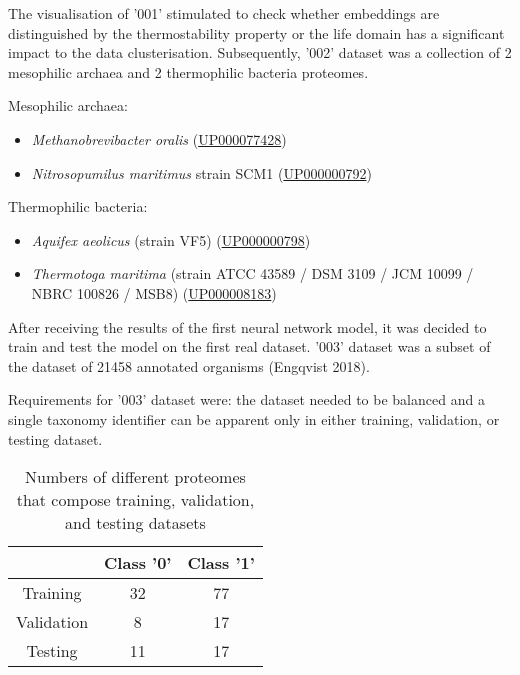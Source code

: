 \documentclass[12pt]{report}
\begin{document}
	The visualisation of '001' stimulated to check whether embeddings are 
	distinguished by the thermostability property or the life domain has a
	significant impact to the data clusterisation. Subsequently, '002' dataset 
	was a collection of 2 mesophilic archaea and 2 thermophilic bacteria
	proteomes.

	\vspace*{0.5cm}

	Mesophilic archaea:

	\begin{itemize}
		\item \textit{Methanobrevibacter oralis} 
		(\href{https://www.uniprot.org/proteomes/UP000077428}{UP000077428})
		\item \textit{Nitrosopumilus maritimus} strain SCM1 (\href{https://www.uniprot.org/proteomes/UP000000792}{UP000000792})
	\end{itemize}

	Thermophilic bacteria:

	\begin{itemize}
		\item \textit{Aquifex aeolicus} (strain VF5)
		(\href{https://www.uniprot.org/proteomes/UP000000798}{UP000000798})
		\item \textit{Thermotoga maritima} 
		(strain ATCC 43589 / DSM 3109 / JCM 10099 / NBRC 100826 / MSB8) 
		(\href{https://www.uniprot.org/proteomes/UP000008183}{UP000008183})
	\end{itemize}

	After receiving the results of the first neural network model, it was decided
	to train and test the model on the first real dataset. '003' dataset was a subset
	of the dataset of 21458 annotated organisms (Engqvist 2018). 
	
	Requirements for '003' dataset were: the dataset needed to be balanced and a
	single taxonomy identifier can be apparent only in either training, validation,
	or testing dataset.

	\begin{table}[h!]
		\caption{Numbers of different proteomes that compose training, 
		validation, and testing datasets}
		\label{table:1} 
		\vspace{0.2cm}
		\centering
		\begin{tabular}{ | c | c | c | }
			\hline
			& Class '0' & Class '1' \\
			\hline
			Training & 32 & 77 \\ 
			\hline
			Validation & 8 & 17 \\
			\hline
			Testing & 11 & 17 \\
			\hline   
		\end{tabular}
	\end{table}
\end{document}
